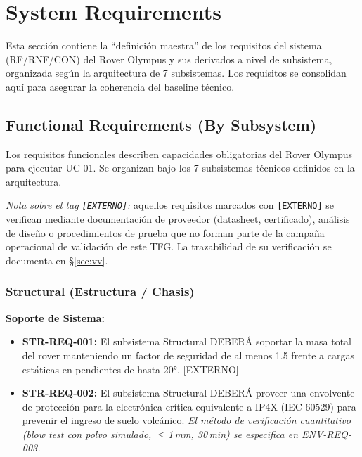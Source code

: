 
\section{System Requirements}\label{sec:requirements}

Esta sección contiene la ``definición maestra'' de los requisitos del sistema (RF/RNF/CON) del Rover Olympus y sus derivados a nivel de subsistema, organizada según la arquitectura de 7 subsistemas. Los requisitos se consolidan aquí para asegurar la coherencia del baseline técnico.

\subsection{Functional Requirements (By Subsystem)}

Los requisitos funcionales describen capacidades obligatorias del Rover Olympus para ejecutar UC-01. Se organizan bajo los 7 subsistemas técnicos definidos en la arquitectura.

\emph{Nota sobre el tag \texttt{[EXTERNO]}:} aquellos requisitos marcados con \texttt{[EXTERNO]} se verifican mediante documentación de proveedor (datasheet, certificado), análisis de diseño o procedimientos de prueba que no forman parte de la campaña operacional de validación de este TFG. La trazabilidad de su verificación se documenta en \S\ref{sec:vv}.

\subsubsection{Structural (Estructura / Chasis)}
\textbf{Soporte de Sistema:}
\begin{itemize}
    \item \textbf{STR-REQ-001:} El subsistema Structural DEBERÁ soportar la masa total del rover manteniendo un factor de seguridad de al menos 1.5 frente a cargas estáticas en pendientes de hasta 20°. [EXTERNO]
    \item \textbf{STR-REQ-002:} El subsistema Structural DEBERÁ proveer una envolvente de protección para la electrónica crítica equivalente a IP4X (IEC 60529) para prevenir el ingreso de suelo volcánico. \emph{El método de verificación cuantitativo (blow test con polvo simulado, $\le$1\,mm, 30\,min) se especifica en ENV-REQ-003.}
\end{itemize}

